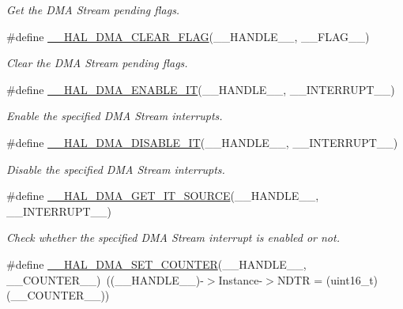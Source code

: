 \begin{DoxyCompactItemize}
\begin{DoxyCompactList}\small\item\em Get the D\+MA Stream pending flags. \end{DoxyCompactList}\item 
\#define \mbox{\hyperlink{group___d_m_a_gabc041fb1c85ea7a3af94e42470ef7f2a}{\+\_\+\+\_\+\+H\+A\+L\+\_\+\+D\+M\+A\+\_\+\+C\+L\+E\+A\+R\+\_\+\+F\+L\+AG}}(\+\_\+\+\_\+\+H\+A\+N\+D\+L\+E\+\_\+\+\_\+,  \+\_\+\+\_\+\+F\+L\+A\+G\+\_\+\+\_\+)
\begin{DoxyCompactList}\small\item\em Clear the D\+MA Stream pending flags. \end{DoxyCompactList}\item 
\#define \mbox{\hyperlink{group___d_m_a_ga2124233229c04ca90b790cd8cddfa98b}{\+\_\+\+\_\+\+H\+A\+L\+\_\+\+D\+M\+A\+\_\+\+E\+N\+A\+B\+L\+E\+\_\+\+IT}}(\+\_\+\+\_\+\+H\+A\+N\+D\+L\+E\+\_\+\+\_\+,  \+\_\+\+\_\+\+I\+N\+T\+E\+R\+R\+U\+P\+T\+\_\+\+\_\+)
\begin{DoxyCompactList}\small\item\em Enable the specified D\+MA Stream interrupts. \end{DoxyCompactList}\item 
\#define \mbox{\hyperlink{group___d_m_a_ga2867eab09398df2daac55c3f327654da}{\+\_\+\+\_\+\+H\+A\+L\+\_\+\+D\+M\+A\+\_\+\+D\+I\+S\+A\+B\+L\+E\+\_\+\+IT}}(\+\_\+\+\_\+\+H\+A\+N\+D\+L\+E\+\_\+\+\_\+,  \+\_\+\+\_\+\+I\+N\+T\+E\+R\+R\+U\+P\+T\+\_\+\+\_\+)
\begin{DoxyCompactList}\small\item\em Disable the specified D\+MA Stream interrupts. \end{DoxyCompactList}\item 
\#define \mbox{\hyperlink{group___d_m_a_ga206f24e6bee4600515b9b6b1ec79365b}{\+\_\+\+\_\+\+H\+A\+L\+\_\+\+D\+M\+A\+\_\+\+G\+E\+T\+\_\+\+I\+T\+\_\+\+S\+O\+U\+R\+CE}}(\+\_\+\+\_\+\+H\+A\+N\+D\+L\+E\+\_\+\+\_\+,  \+\_\+\+\_\+\+I\+N\+T\+E\+R\+R\+U\+P\+T\+\_\+\+\_\+)
\begin{DoxyCompactList}\small\item\em Check whether the specified D\+MA Stream interrupt is enabled or not. \end{DoxyCompactList}\item 
\#define \mbox{\hyperlink{group___d_m_a_ga448a8f809df86ccffae200ffd33d0a82}{\+\_\+\+\_\+\+H\+A\+L\+\_\+\+D\+M\+A\+\_\+\+S\+E\+T\+\_\+\+C\+O\+U\+N\+T\+ER}}(\+\_\+\+\_\+\+H\+A\+N\+D\+L\+E\+\_\+\+\_\+,  \+\_\+\+\_\+\+C\+O\+U\+N\+T\+E\+R\+\_\+\+\_\+)~((\+\_\+\+\_\+\+H\+A\+N\+D\+L\+E\+\_\+\+\_\+)-\/$>$Instance-\/$>$N\+D\+TR = (uint16\+\_\+t)(\+\_\+\+\_\+\+C\+O\+U\+N\+T\+E\+R\+\_\+\+\_\+))

\end{DoxyCompactItemize}
